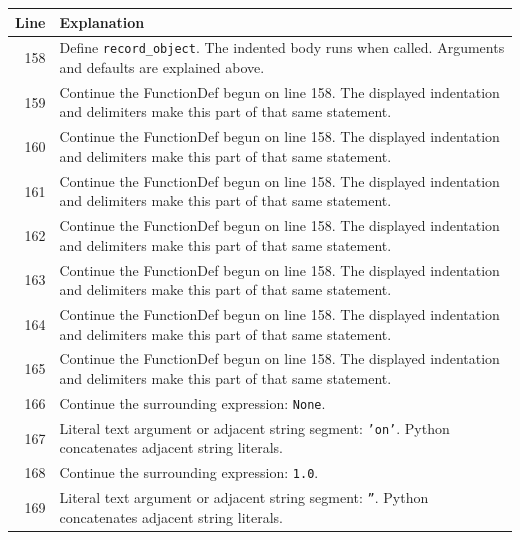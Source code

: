 \documentclass[11pt,a4paper]{book}
\begin{document}
\begin{longtable}{r p{}}

\textbf{Line} & \textbf{Explanation} \\ \hline \endhead

158 & Define \texttt{record\_object}. The indented body runs when called. Arguments and defaults are explained above. \\

159 & Continue the FunctionDef begun on line 158. The displayed indentation and delimiters make this part of that same statement. \\

160 & Continue the FunctionDef begun on line 158. The displayed indentation and delimiters make this part of that same statement. \\

161 & Continue the FunctionDef begun on line 158. The displayed indentation and delimiters make this part of that same statement. \\

162 & Continue the FunctionDef begun on line 158. The displayed indentation and delimiters make this part of that same statement. \\

163 & Continue the FunctionDef begun on line 158. The displayed indentation and delimiters make this part of that same statement. \\

164 & Continue the FunctionDef begun on line 158. The displayed indentation and delimiters make this part of that same statement. \\

165 & Continue the FunctionDef begun on line 158. The displayed indentation and delimiters make this part of that same statement. \\

166 & Continue the surrounding expression: \texttt{None}. \\

167 & Literal text argument or adjacent string segment: \texttt{'on'}. Python concatenates adjacent string literals. \\

168 & Continue the surrounding expression: \texttt{1.0}. \\

169 & Literal text argument or adjacent string segment: \texttt{''}. Python concatenates adjacent string literals. \\


\end{longtable}
\end{document}
